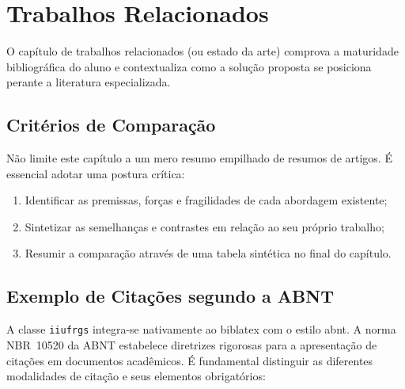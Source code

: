 \documentclass[cic,tc,biblatex]{iiufrgs}
\begin{document}
\chapter{Trabalhos Relacionados}
\label{cap:relacionados}

O capítulo de trabalhos relacionados (ou estado da arte) comprova a maturidade bibliográfica do aluno e contextualiza como a solução proposta se posiciona perante a literatura especializada.

\section{Critérios de Comparação}
Não limite este capítulo a um mero resumo empilhado de resumos de artigos. É essencial adotar uma postura crítica:
\begin{enumerate}
    \item Identificar as premissas, forças e fragilidades de cada abordagem existente;
    \item Sintetizar as semelhanças e contrastes em relação ao seu próprio trabalho;
    \item Resumir a comparação através de uma tabela sintética no final do capítulo.
\end{enumerate}

\section{Exemplo de Citações segundo a ABNT}
\label{sec:citacoes_abnt}

A classe \texttt{iiufrgs} integra-se nativamente ao \textsf{biblatex} com o estilo \textsf{abnt}. A norma NBR~10520 da ABNT estabelece diretrizes rigorosas para a apresentação de citações em documentos acadêmicos. É fundamental distinguir as diferentes modalidades de citação e seus elementos obrigatórios:
\end{document}
